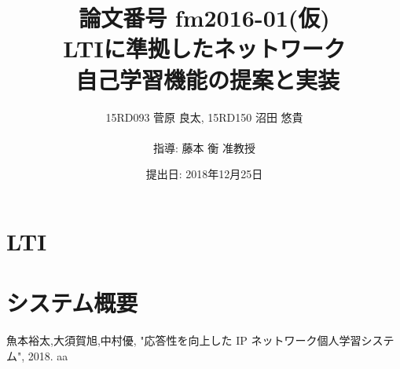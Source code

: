 \documentclass[11pt, a4paper]{jarticle}
\title{\LARGE 論文番号 fm2016-01(仮)\\ \Huge LTIに準拠したネットワーク\\自己学習機能の提案と実装}
\author{15RD093 菅原 良太, 15RD150 沼田 悠貴\\ \\指導: 藤本 衡 准教授}
\date{提出日: 2018年12月25日}
\begin{document}
\pagestyle{normal}
\maketitle
\thispagestyle{normal}
\clearpage


\fontsize{11pt}{28pt}\selectfont


\clearpage

\tableofcontents
\clearpage


\clearpage

%

\section{LTI}

%
%
%


\section{システム概要}



\clearpage


\clearpage



\clearpages

\begin{thebibliography}{99}
   魚本裕太,大須賀旭,中村優, "応答性を向上した
IP ネットワーク個人学習システム", 2018.
   aa
\end{thebibliography}
\end{document}
